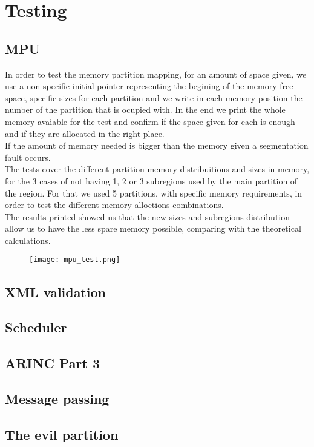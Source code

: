 \chapter{Testing}

\section{MPU}
In order to test the memory partition mapping, for an amount of space given, we use a non-specific initial
 pointer representing the begining of the memory free space, specific sizes for each partition and we
  write in each memory position the number of the partition that is ocupied with. In the end we print the
   whole memory avaiable for the test and confirm if the space given for each is enough and if they are
    allocated in the right place.\\
  If the amount of memory needed is bigger than the memory given a segmentation fault occurs.\\
 The tests cover the different partition memory distribuitions and sizes in memory, for the 3 cases of not
  having 1, 2 or  3 subregions used by the main partition of the region. For that we used 5 partitions, with
   specific memory requirements, in order to test the different memory alloctions combinations.\\
  The results printed showed us that the new sizes and subregions distribution allow us to have the less 
  spare memory possible, comparing with the theoretical calculations.\\
\begin{figure}[H]
\centering
\texttt{[image: mpu\_test.png]}
\label{fig:simple_system}
\end{figure}

\section{XML validation}

\section{Scheduler}

\section{ARINC Part 3}

\section{Message passing}

\section{The evil partition}